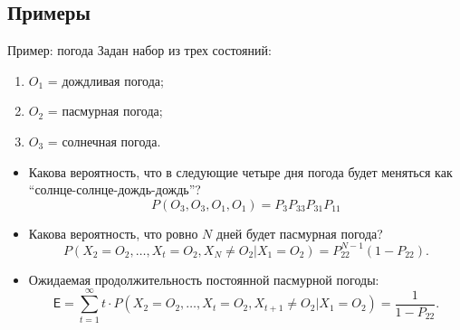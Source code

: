 \subsection{Примеры}
\begin{frame}{Пример: погода}
Задан набор из трех состояний:
\begin{enumerate}
\item $O_1$ = дождливая погода;
\item $O_2$ = пасмурная погода;
\item $O_3$ = солнечная погода.
\end{enumerate}
\begin{itemize}
\item Какова вероятность, что в следующие четыре дня погода будет меняться как ``солнце-солнце-дождь-дождь''?
\[
    P(O_3, O_3, O_1, O_1) = P_3P_{33}P_{31}P_{11}
\]
\item Какова вероятность, что ровно $N$ дней будет пасмурная погода?
\[
    P(X_2 = O_2,\dots,X_t = O_2, X_{N} \neq O_2|X_1=O_2) = P_{22}^{N-1}(1-P_{22}).
\]
\item Ожидаемая продолжительность постоянной пасмурной погоды:
\[
    \mathsf{E} = \sum_{t=1}^\infty t \cdot P(X_2 = O_2,\dots,X_t = O_2, X_{t+1} \neq O_2|X_1=O_2) = \frac{1}{1-P_{22}}.
\]
\end{itemize}
\end{frame}
